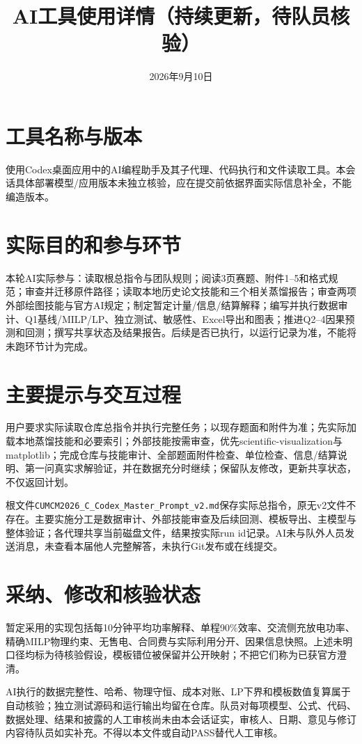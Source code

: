 \documentclass[UTF8,11pt,a4paper]{ctexart}
\title{AI工具使用详情（持续更新，待队员核验）}
\author{}\date{2026年9月10日}
\begin{document}
\pagestyle{plain}\maketitle
\section{工具名称与版本}
使用Codex桌面应用中的AI编程助手及其子代理、代码执行和文件读取工具。本会话具体部署模型/应用版本未独立核验，应在提交前依据界面实际信息补全，不能编造版本。
\section{实际目的和参与环节}
本轮AI实际参与：读取根总指令与团队规则；阅读3页赛题、附件1--5和格式规范；审查并迁移原件路径；读取本地历史论文技能和三个相关蒸馏报告；审查两项外部绘图技能与官方AI规定；制定暂定计量/信息/结算解释；编写并执行数据审计、Q1基线/MILP/LP、独立测试、敏感性、Excel导出和图表；推进Q2--4因果预测和回测；撰写共享状态及结果报告。后续是否已执行，以运行记录为准，不能将未跑环节计为完成。
\section{主要提示与交互过程}
用户要求实际读取仓库总指令并执行完整任务；以现存题面和附件为准；先实际加载本地蒸馏技能和必要索引；外部技能按需审查，优先scientific-visualization与matplotlib；完成仓库与技能审计、全部题面附件检查、单位检查、信息/结算说明、第一问真实求解验证，并在数据充分时继续；保留队友修改，更新共享状态，不仅返回计划。

根文件\texttt{CUMCM2026\_C\_Codex\_Master\_Prompt\_v2.md}保存实际总指令，原无v2文件不存在。主要实施分工是数据审计、外部技能审查及后续回测、模板导出、主模型与整体验证；各代理共享当前磁盘文件，结果按实际run id记录。AI未与队外人员发送消息，未查看本届他人完整解答，未执行Git发布或在线提交。
\section{采纳、修改和核验状态}
暂定采用的实现包括每10分钟平均功率解释、单程90\%效率、交流侧充放电功率、精确MILP物理约束、无售电、合同费与实际利用分开、因果信息快照。上述未明口径均标为待核验假设，模板错位被保留并公开映射；不把它们称为已获官方澄清。

AI执行的数据完整性、哈希、物理守恒、成本对账、LP下界和模板数值复算属于自动核验；独立测试源码和运行输出均留在仓库。队员对每项模型、公式、代码、数据处理、结果和披露的人工审核尚未由本会话证实，审核人、日期、意见与修订内容待队员如实补充。不得以本文件或自动PASS替代人工审核。
\end{document}
